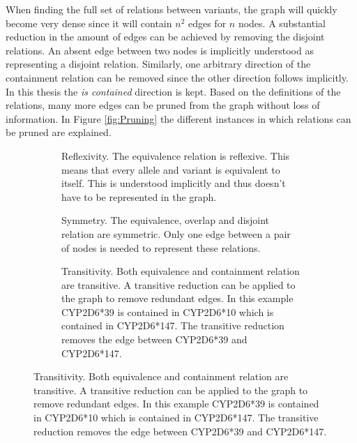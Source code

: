 When finding the full set of relations between variants, the graph will quickly become very dense since it will contain $n^2$ edges for $n$ nodes. 
A substantial reduction in the amount of edges can be achieved by removing the disjoint relations. 
An absent edge between two nodes is implicitly understood as representing a disjoint relation. 
Similarly, one arbitrary direction of the containment relation can be removed since the other direction follows implicitly. 
In this thesis the \textit{is contained} direction is kept.
Based on the definitions of the relations, many more edges can be pruned from the graph without loss of information.
In Figure \ref{fig:Pruning} the different instances in which relations can be pruned are explained.
%
%
\begin{figure}
    \newcommand{\subfigurelength}{0.35\textwidth} %
    \centering
    \begin{subfigure}{\subfigurelength}
        \centering
        
        \caption{Reflexivity. 
            The equivalence relation is reflexive. 
            This means that every allele and variant is equivalent to itself. 
            This is understood implicitly and thus doesn't have to be represented in the graph.
        }
        \label{sfig:Reflexivity}
    \end{subfigure}
    \begin{subfigure}{\subfigurelength}
        \centering
        
        \caption{Symmetry. 
            The equivalence, overlap and disjoint relation are symmetric. 
            Only one edge between a pair of nodes is needed to represent these relations.
        }
        \label{sfig:Symmetry}
    \end{subfigure}
    \begin{subfigure}{\subfigurelength}
        \centering
        
        \caption{Transitivity. 
            Both equivalence and containment relation are transitive. 
            A transitive reduction can be applied to the graph to remove redundant edges. 
            In this example CYP2D6*39 is contained in CYP2D6*10 which is contained in CYP2D6*147. 
            The transitive reduction removes the edge between CYP2D6*39 and CYP2D6*147.
        }
        \label{sfig:Transitivity}
    \end{subfigure}

\end{figure}
